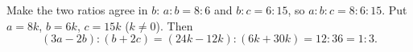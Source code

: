 Make the two ratios agree in $b$: $a:b=8:6$ and $b:c=6:15$, so $a:b:c=8:6:15$. Put $a=8k$, $b=6k$, $c=15k$ ($k\ne0$). Then
\[
(3a-2b):(b+2c)=(24k-12k):(6k+30k)=12:36=\boxed{1:3}.
\]
